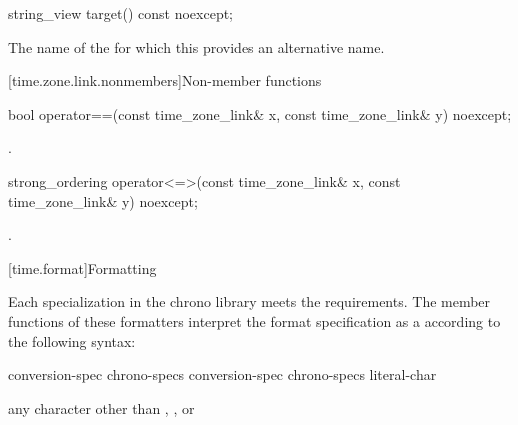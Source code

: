 %
\begin{itemdecl}
string_view target() const noexcept;
\end{itemdecl}

\begin{itemdescr}
\pnum
\returns
The name of the  for which
this  provides an alternative name.
\end{itemdescr}

[time.zone.link.nonmembers]{Non-member functions}

%
\begin{itemdecl}
bool operator==(const time_zone_link& x, const time_zone_link& y) noexcept;
\end{itemdecl}

\begin{itemdescr}
\pnum
\returns
{}.
\end{itemdescr}

%
\begin{itemdecl}
strong_ordering operator<=>(const time_zone_link& x, const time_zone_link& y) noexcept;
\end{itemdecl}

\begin{itemdescr}
\pnum
\returns
{}.
\end{itemdescr}

[time.format]{Formatting}
%

\pnum
Each  specialization
in the chrono library
meets the  requirements.
The  member functions of these formatters
interpret the format specification
as a 
according to the following syntax:

\begin{ncbnf}
\br
       
\end{ncbnf}

\begin{ncbnf}
\br
    conversion-spec\br
    chrono-specs conversion-spec\br
    chrono-specs literal-char
\end{ncbnf}

\begin{ncbnf}
\br
    \textnormal{any character other than \tcode{\{}, \tcode{\}}, or \tcode{\%}}
\end{ncbnf}

